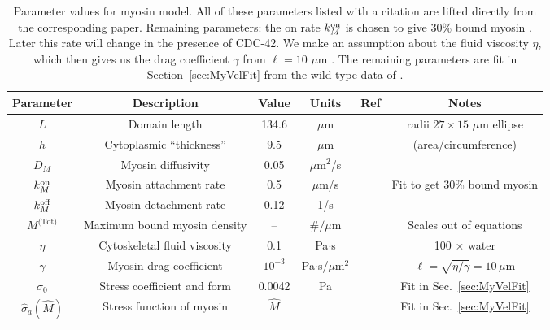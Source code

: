 \documentclass[11pt]{article}
\newcommand{\6}[1]{#1_{\text{6}}}
\newcommand{\3}[1]{#1_{\text{3}}}
\newcommand{\Tot}[1]{#1^\text{(Tot)}}
\newcommand{\My}[1]{#1_M}
\begin{document}
\begin{table}
\begin{small}
\centering
\begin{tabular}{|c|c|c|c|c|c|}\hline
Parameter & Description & Value & Units & Ref & Notes \\ \hline
$L$ & Domain length & 134.6 & $\mu$m &  \cite{goehring2011polarization} & radii $27 \times 15$ $\mu$m ellipse\\
$h$ & Cytoplasmic ``thickness'' & 9.5 & $\mu$m &  \cite{goehring2011polarization}  &  (area/circumference)\\ \hline
$\My{D}$ & Myosin diffusivity & 0.05 & $\mu$m$^2$/s &\cite{gross2019guiding} & \\
$\My{\kon}$ & Myosin attachment rate & 0.5 & $\mu$m/s & & Fit to get 30\% bound myosin\\
$\My{\koff} $ & Myosin detachment rate & 0.12 & 1/s & \cite{gross2019guiding}& \\
$\Tot{M}$ & Maximum bound myosin density & -- & $\#/\mu$m & & Scales out of equations \\ \hline
$\eta$ & Cytoskeletal fluid viscosity & 0.1 & Pa$\cdot$s & &100 $\times$ water \\
$\gamma$ & Myosin drag coefficient & $10^{-3}$ & Pa$\cdot$s/$\mu$m$^2$ &  & $\ell=\sqrt{\eta/\gamma}=10 \, \mu$m \cite{saha2016determining}\\ 
$\sigma_0$ & Stress coefficient and form& 0.0042 & Pa & & Fit in Sec.\ \ref{sec:MyVelFit}\\
$\hat \sigma_a(\hat M)$ & Stress function of myosin& $\hat M$ & & & Fit in Sec.\ \ref{sec:MyVelFit}\\ \hline
\end{tabular}
\caption{\label{tab:paramsMy} Parameter values for myosin model. All of these parameters listed with a citation are lifted directly from the corresponding paper. Remaining parameters: the on rate $\My{\kon}$ is chosen to give 30\% bound myosin \cite[Fig.~S3]{gross2019guiding}. Later this rate will change in the presence of CDC-42. We make an assumption about the fluid viscosity $\eta$, which then gives us the drag coefficient $\gamma$ from $\ell=10$ $\mu$m \cite{gross2019guiding}. The remaining parameters are fit in Section\ \ref{sec:MyVelFit} from the wild-type data of \cite{sailer2015dynamic}. }
\end{small}
\end{table}
\end{document}
